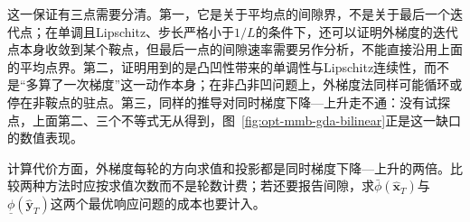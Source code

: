 这一保证有三点需要分清。第一，它是关于平均点的间隙界，不是关于最后一个迭代点；在单调且Lipschitz、步长严格小于$1/L$的条件下，还可以证明外梯度的迭代点本身收敛到某个鞍点，但最后一点的间隙速率需要另作分析，不能直接沿用上面的平均点界。第二，证明用到的是凸凹性带来的单调性与Lipschitz连续性，而不是“多算了一次梯度”这一动作本身；在非凸非凹问题上，外梯度法同样可能循环或停在非鞍点的驻点。第三，同样的推导对同时梯度下降—上升走不通：没有试探点，上面第二、三个不等式无从得到，图~\ref{fig:opt-mmb-gda-bilinear}正是这一缺口的数值表现。

计算代价方面，外梯度每轮的方向求值和投影都是同时梯度下降—上升的两倍。比较两种方法时应按求值次数而不是轮数计费；若还要报告间隙，求$\bar\phi(\hat{\bm x}_T)$与$\underline\phi(\hat{\bm y}_T)$这两个最优响应问题的成本也要计入。
